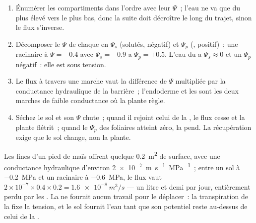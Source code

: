\begin{method}\label{met:b1:plant-water-minerals:profile}
\begin{enumerate}
  \item Énumérer les compartiments dans l'ordre avec leur $\Psi$~;
        l'eau ne va que du plus élevé vers le plus bas, donc la suite
        doit décroître le long du trajet, sinon le flux s'inverse.
  \item Décomposer le $\Psi$ de chaque  en $\Psi_s$ (solutés,
        négatif) et $\Psi_p$ (, positif)~; une 
        racinaire à $\Psi = -0.4$ avec $\Psi_s = -0.9$ a
        $\Psi_p = +0.5$. L'eau du  a $\Psi_s \approx 0$ et un
        $\Psi_p$ négatif~: elle est sous tension.
  \item Le flux à travers une marche vaut la différence de $\Psi$
        multipliée par la conductance hydraulique de la barrière~;
        l'endoderme et les  sont les deux marches de faible
        conductance où la plante règle.
  \item Séchez le sol et son $\Psi$ chute~; quand il rejoint celui de la
        , le flux cesse et la plante flétrit~; quand le $\Psi_p$
        des  foliaires atteint zéro, la  pend. La
        récupération exige que le sol change, non la plante.
\end{enumerate}
\end{method}

\begin{example}\label{ex:b1:plant-water-minerals:litre}
Les  fines d'un pied de maïs offrent quelque \qty{0.2}{m^2} de
surface, avec une conductance hydraulique d'environ
\qty{2e-7}{m.s^{-1}.MPa^{-1}}~; entre un sol à \qty{-0.2}{MPa} et un
 racinaire à \qty{-0.6}{MPa}, le flux vaut
$2\times 10^{-7}\times 0.4\times 0.2 = \qty{1.6e-8}{m^3/s}$ --- un litre
et demi par jour, entièrement perdu par les . La  ne
fournit aucun travail pour le déplacer~: la transpiration de la 
fixe la tension, et le sol fournit l'eau tant que son potentiel reste
au-dessus de celui de la .
\end{example}

